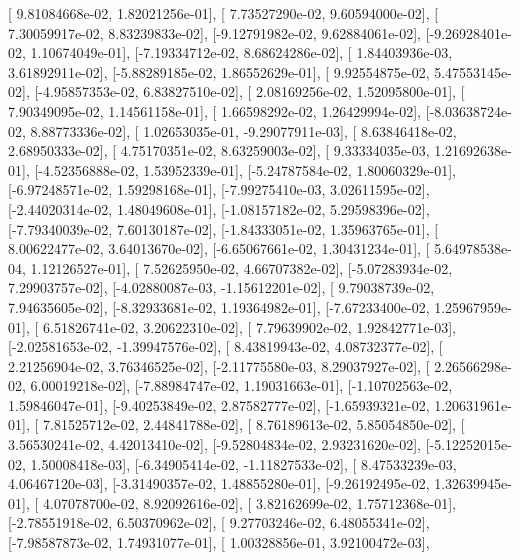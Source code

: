 \documentclass{article}
\begin{document}
       [ 9.81084668e-02,  1.82021256e-01],
       [ 7.73527290e-02,  9.60594000e-02],
       [ 7.30059917e-02,  8.83239833e-02],
       [-9.12791982e-02,  9.62884061e-02],
       [-9.26928401e-02,  1.10674049e-01],
       [-7.19334712e-02,  8.68624286e-02],
       [ 1.84403936e-03,  3.61892911e-02],
       [-5.88289185e-02,  1.86552629e-01],
       [ 9.92554875e-02,  5.47553145e-02],
       [-4.95857353e-02,  6.83827510e-02],
       [ 2.08169256e-02,  1.52095800e-01],
       [ 7.90349095e-02,  1.14561158e-01],
       [ 1.66598292e-02,  1.26429994e-02],
       [-8.03638724e-02,  8.88773336e-02],
       [ 1.02653035e-01, -9.29077911e-03],
       [ 8.63846418e-02,  2.68950333e-02],
       [ 4.75170351e-02,  8.63259003e-02],
       [ 9.33334035e-03,  1.21692638e-01],
       [-4.52356888e-02,  1.53952339e-01],
       [-5.24787584e-02,  1.80060329e-01],
       [-6.97248571e-02,  1.59298168e-01],
       [-7.99275410e-03,  3.02611595e-02],
       [-2.44020314e-02,  1.48049608e-01],
       [-1.08157182e-02,  5.29598396e-02],
       [-7.79340039e-02,  7.60130187e-02],
       [-1.84333051e-02,  1.35963765e-01],
       [ 8.00622477e-02,  3.64013670e-02],
       [-6.65067661e-02,  1.30431234e-01],
       [ 5.64978538e-04,  1.12126527e-01],
       [ 7.52625950e-02,  4.66707382e-02],
       [-5.07283934e-02,  7.29903757e-02],
       [-4.02880087e-03, -1.15612201e-02],
       [ 9.79038739e-02,  7.94635605e-02],
       [-8.32933681e-02,  1.19364982e-01],
       [-7.67233400e-02,  1.25967959e-01],
       [ 6.51826741e-02,  3.20622310e-02],
       [ 7.79639902e-02,  1.92842771e-03],
       [-2.02581653e-02, -1.39947576e-02],
       [ 8.43819943e-02,  4.08732377e-02],
       [ 2.21256904e-02,  3.76346525e-02],
       [-2.11775580e-03,  8.29037927e-02],
       [ 2.26566298e-02,  6.00019218e-02],
       [-7.88984747e-02,  1.19031663e-01],
       [-1.10702563e-02,  1.59846047e-01],
       [-9.40253849e-02,  2.87582777e-02],
       [-1.65939321e-02,  1.20631961e-01],
       [ 7.81525712e-02,  2.44841788e-02],
       [ 8.76189613e-02,  5.85054850e-02],
       [ 3.56530241e-02,  4.42013410e-02],
       [-9.52804834e-02,  2.93231620e-02],
       [-5.12252015e-02,  1.50008418e-03],
       [-6.34905414e-02, -1.11827533e-02],
       [ 8.47533239e-03,  4.06467120e-03],
       [-3.31490357e-02,  1.48855280e-01],
       [-9.26192495e-02,  1.32639945e-01],
       [ 4.07078700e-02,  8.92092616e-02],
       [ 3.82162699e-02,  1.75712368e-01],
       [-2.78551918e-02,  6.50370962e-02],
       [ 9.27703246e-02,  6.48055341e-02],
       [-7.98587873e-02,  1.74931077e-01],
       [ 1.00328856e-01,  3.92100472e-03],
\end{document}
